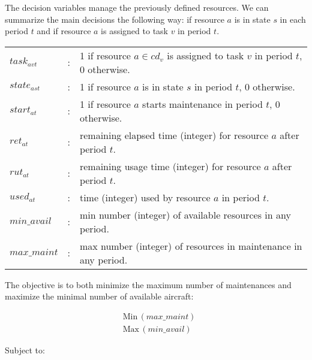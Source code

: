 \documentclass{roadef}
\begin{document}

    The decision variables manage the previously defined resources. We can summarize the main decisions the following way: if resource $a$ is in state $s$ in each period $t$ and if resource $a$ is assigned to task $v$ in period $t$.

    \begin{tabular}{p{15mm}lp{105mm}}
        $task_{avt}$        & : & 1 if resource $a \in cd_v$ is assigned to task $v$ in period $t$, 0 otherwise. \\  
        $state_{ast}$       & : & 1 if resource $a$ is in state $s$ in period $t$, 0 otherwise. \\  
        $start_{at}$        & : & 1 if resource $a$ starts maintenance in period $t$, 0 otherwise. \\
        $ret_{at}$          & : & remaining elapsed time (integer) for resource $a$ after period $t$. \\  
        $rut_{at}$          & : & remaining usage time (integer) for resource $a$ after period $t$. \\  
        $used_{at}$         & : & time (integer) used by resource $a$ in period $t$. \\
        $min\_avail$        & : & min number (integer) of available resources in any period. \\
        $max\_maint$        & : & max number (integer) of resources in maintenance in any period. \\
    \end{tabular}
    \bigskip


    The objective is to both minimize the maximum number of maintenances and maximize the minimal number of available aircraft:

    \begin{align}
        & \text{Min}\, (max\_maint) \\
        & \text{Max}\, (min\_avail)
    \end{align}

    Subject to:
        
\end{document}
